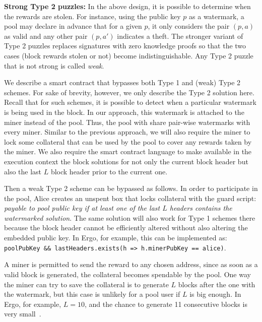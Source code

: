 \documentclass[runningheads]{llncs}
\begin{document}
\textbf{Strong Type 2 puzzles:} In the above design, it is possible to determine when the rewards are stolen. For instance, using the public key $p$ as a watermark, a pool may declare in advance that for a given $p$, it only considers the pair $(p, a)$ as valid and any other pair $(p, a')$ indicates a theft. The stronger variant of Type 2 puzzles replaces signatures with zero knowledge proofs so that the two cases (block rewards stolen or not) become indistinguishable. Any Type 2 puzzle that is not strong is called {\em weak}.

We describe a smart contract that bypasses both Type 1 and (weak) Type 2 schemes. For sake of brevity, however, we only describe the Type 2 solution here. Recall that for such schemes, it is possible to detect when a particular watermark is being used in the block. In our approach, this watermark is attached to the miner instead of the pool. Thus, the pool with share pair-wise watermarks with every miner. Similar to the previous approach, we will also require the miner to lock some collateral that can be used by the pool to cover any rewards taken by the miner.
We also require the smart contract language to make available in the execution context the block solutions for not only the current block header but also the last $L$ block header prior to the current one. 

Then a weak Type 2 scheme can be bypassed as follows. In order to participate in the pool, Alice creates an unspent box that locks collateral with the guard script: {\em payable to pool public key if at least one of the last $L$ headers contains the watermarked solution}. The same solution will also work for Type 1 schemes there because the block header cannot be efficiently altered without also altering the embedded public key. In Ergo, for example, this can be implemented as: \texttt{poolPubKey \&\& lastHeaders.exists(h => h.minerPubKey == alice)}.

A miner is permitted to send the reward to any chosen address, since as soon as a valid block is generated, the collateral becomes spendable by the pool. One way the miner can try to save the collateral is to generate $L$ blocks after the one with the watermark, but this case is unlikely for a pool user if $L$ is big enough. In Ergo, for example, $L = 10$, and the chance to generate 11 consecutive blocks is very small~\cite{Nak08}. 
\end{document}
